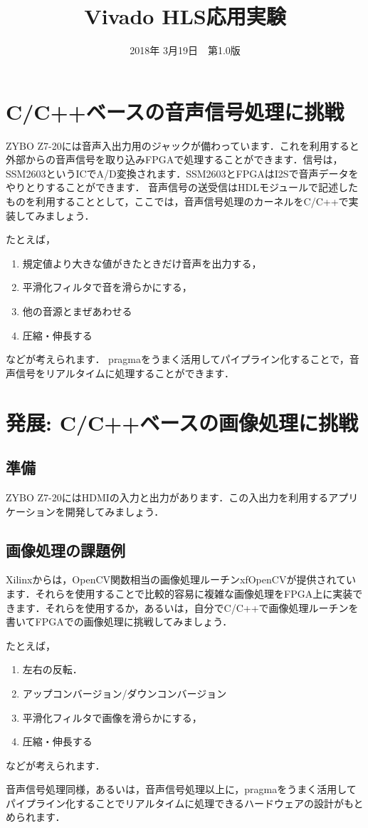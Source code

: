 \documentclass[a4paper,dvipdfmx]{jsarticle}
\begin{document}
\title{Vivado HLS応用実験}
\author{}
\date{2018年 3月19日~~第1.0版}
\maketitle

\section{C/C++ベースの音声信号処理に挑戦}

ZYBO Z7-20には音声入出力用のジャックが備わっています．これを利用すると外部からの音声信号を取り込みFPGAで処理することができます．信号は，SSM2603というICでA/D変換されます．SSM2603とFPGAはI2Sで音声データをやりとりすることができます．
音声信号の送受信はHDLモジュールで記述したものを利用することとして，ここでは，音声信号処理のカーネルをC/C++で実装してみましょう．

たとえば，
\begin{enumerate}
 \item 規定値より大きな値がきたときだけ音声を出力する，
 \item 平滑化フィルタで音を滑らかにする，
 \item 他の音源とまぜあわせる
 \item 圧縮・伸長する
\end{enumerate}
などが考えられます．
pragmaをうまく活用してパイプライン化することで，音声信号をリアルタイムに処理することができます．

\section{発展: C/C++ベースの画像処理に挑戦}

\subsection{準備}
ZYBO Z7-20にはHDMIの入力と出力があります．この入出力を利用するアプリケーションを開発してみましょう．

\subsection{画像処理の課題例}
Xilinxからは，OpenCV関数相当の画像処理ルーチンxfOpenCVが提供されています．それらを使用することで比較的容易に複雑な画像処理をFPGA上に実装できます．それらを使用するか，あるいは，自分でC/C++で画像処理ルーチンを書いてFPGAでの画像処理に挑戦してみましょう．

たとえば，
\begin{enumerate}
 \item 左右の反転．
 \item アップコンバージョン/ダウンコンバージョン
 \item 平滑化フィルタで画像を滑らかにする，
 \item 圧縮・伸長する
\end{enumerate}
などが考えられます．

音声信号処理同様，あるいは，音声信号処理以上に，pragmaをうまく活用してパイプライン化することでリアルタイムに処理できるハードウェアの設計がもとめられます．
\end{document}
